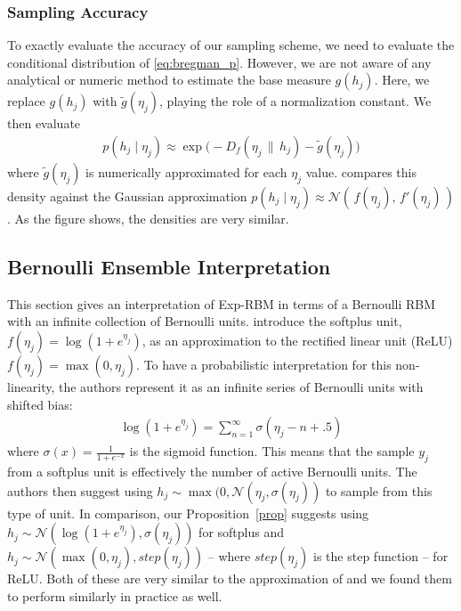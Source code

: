 \documentclass[twoside]{article}
\theoremstyle{plain}
\theoremstyle{definition}
\newtheorem{example}{Example}[section]
\theoremstyle{remark}
\newcommand{\refEq}[1]{\cref{#1}}%
\newcommand{\boldit}[1]{\ensuremath{#1}}
\newcommand{\sfit}[1]{\ensuremath{#1}}
\newcommand{\y}[0]{\ensuremath{{h}}}%
\newcommand{\pp}[0]{\ensuremath{\sfit{p}}}%
\newcommand{\ff}[0]{\ensuremath{\sfit{f}}}%
\newcommand{\DD}[0]{\ensuremath{\boldit{\sfit{D}}}}%
\newcommand{\gh}[0]{\ensuremath{\sfit{g}}}%
\newcommand{\YY}[0]{\ensuremath{\mathcal{H}}}%
\newcommand{\normal}[0]{\ensuremath{\mathcal{N}}}%
\begin{document}

\subsubsection{Sampling Accuracy}
To exactly evaluate the accuracy of our sampling scheme, we need to 
evaluate the conditional distribution of \refEq{eq:bregman_p}.
However, we are not aware of any analytical or numeric method to estimate 
the base measure $\gh(\y_j)$. Here, we replace $\gh(\y_j)$ with $\tilde{\gh}(\eta_j)$,
playing the role of a normalization constant. We then evaluate   
\begin{align}\label{eq:approx1}
\pp( \y_j \mid \eta_j) \approx \exp \big( -\DD_{\ff}(\eta_j\,\|\, \y_j) - \tilde{\gh}(\eta_j) \big)
\end{align}
where 
$\tilde{\gh}(\eta_j)$ is numerically approximated for each $\eta_j$ value.  compares this density  against the Gaussian approximation  
$\pp( \y_j \mid \eta_j) \approx \normal(\, \ff(\eta_j),\, \ff'(\eta_j)\,)$.
As the figure shows, the densities are very similar. 



\subsection{Bernoulli Ensemble Interpretation}
This section gives an interpretation of Exp-RBM in terms of a Bernoulli RBM with an infinite collection of Bernoulli units. 
\citet{nair2010rectified} introduce the softplus unit, $\ff(\eta_j) = \log(1 + e^{\eta_j})$, as an approximation to the rectified linear unit (ReLU) $\ff(\eta_j) = \max(0, \eta_j)$. To have a probabilistic interpretation for this non-linearity, the authors represent it as an infinite series of
Bernoulli units with shifted bias:
\begin{align}
  \label{eq:stepped_sigmoid}
  \log(1 + e^{\eta_j}) = \sum_{n = 1}^{\infty} \sigma(\eta_j - n + .5)
\end{align}
where $\sigma(x) = \frac{1}{1 + e^{-x}}$ is the sigmoid function. This means that the sample $y_j$ from a softplus unit is effectively the number of active Bernoulli units. 
The authors then suggest using $\y_j \sim
\max(0, \normal(\eta_j, \sigma(\eta_j))$ to sample from this type of unit. In comparison, our Proposition~\ref{prop} suggests using  $\y_j \sim \normal(\log(1 + e^{\eta_j}), \sigma(\eta_j))$ for softplus and $\y_j \sim \normal(\max(0, \eta_j), step(\eta_j))$ -- where $step(\eta_j)$ is the step function -- for ReLU. Both of these are very similar to the approximation of \citep{nair2010rectified} and we found them to perform similarly in practice as well. 
\end{document}
